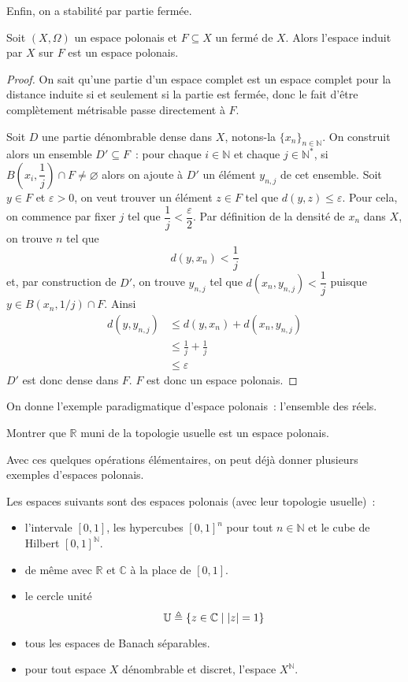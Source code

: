 Enfin, on a stabilité par partie fermée.

\begin{proposition}\label{desc.ferme.polonais}
  Soit $(X,\Omega)$ un espace polonais et $F\subseteq X$ un fermé de $X$. Alors
  l'espace induit par $X$ sur $F$ est un espace polonais.
\end{proposition}

\begin{proof}
  On sait qu'une partie d'un espace complet est un espace complet pour la
  distance induite si et seulement si la partie est fermée, donc le fait d'être
  complètement métrisable passe directement à $F$.
  
  Soit $D$ une partie dénombrable dense dans $X$, notons-la
  $\{x_n\}_{n\in\mathbb N}$. On construit alors un ensemble $D'\subseteq F$~: pour
  chaque $i\in \mathbb N$ et chaque $j\in \mathbb N^*$, si
  $B\left(x_i,\dfrac{1}{j}\right)\cap F\neq\varnothing$ alors on ajoute à $D'$
  un élément $y_{n,j}$ de cet ensemble. Soit $y\in F$ et $\varepsilon > 0$, on
  veut trouver un élément $z\in F$ tel que $d(y,z) \leq \varepsilon$. Pour
  cela, on commence par fixer $j$ tel que
  $\dfrac{1}{j} < \dfrac{\varepsilon}{2}$. Par définition de la densité de $x_n$
  dans $X$, on trouve $n$ tel que
  \[d(y,x_n) < \frac{1}{j}\]
  et, par construction de $D'$, on trouve $y_{n,j}$ tel que
  $d(x_n,y_{n,j})<\dfrac{1}{j}$ puisque $y \in B(x_n,1/j)\cap F$. Ainsi
  \begin{align*}
    d(y,y_{n,j}) &\leq d(y,x_n) + d(x_n,y_{n,j})\\
    &\leq \frac{1}{j} + \frac{1}{j}\\
    &\leq \varepsilon
  \end{align*}
  $D'$ est donc dense dans $F$. $F$ est donc un espace polonais.
\end{proof}

On donne l'exemple paradigmatique d'espace polonais~: l'ensemble des réels.

\begin{exercise}
  Montrer que $\mathbb R$ muni de la topologie usuelle est un espace polonais.
\end{exercise}

Avec ces quelques opérations élémentaires, on peut déjà donner plusieurs
exemples d'espaces polonais.

\begin{example}
  Les espaces suivants sont des espaces polonais (avec leur topologie usuelle)~:
  \begin{itemize}
  \item l'intervale $[0,1]$, les hypercubes $[0,1]^n$ pour tout $n\in\mathbb N$
    et le cube de Hilbert $[0,1]^{\mathbb N}$.
  \item de même avec $\mathbb R$ et $\mathbb C$ à la place de $[0,1]$.
  \item le cercle unité \[\mathbb U \triangleq \{z\in \mathbb C\mid |z| = 1\}\]
  \item tous les espaces de Banach séparables.
  \item pour tout espace $X$ dénombrable et discret, l'espace $X^\mathbb N$.
  \end{itemize}
\end{example}

